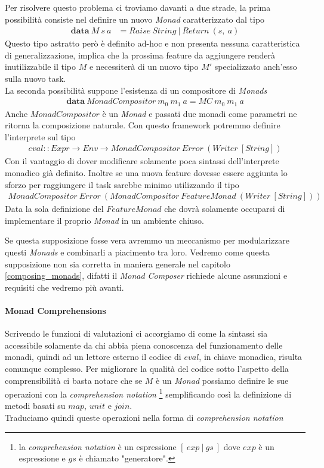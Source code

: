 Per risolvere questo problema ci troviamo davanti a due strade, la prima
possibilità consiste nel definire un nuovo \textit{Monad} caratterizzato dal
tipo
\begin{align*}
  \textbf{data}\ M\ s\ a &= Raise\ String\ |\ Return\ (s,\ a)
\end{align*}
Questo tipo astratto però è definito ad-hoc e non presenta nessuna
caratteristica di generalizzazione, implica che la prossima feature da
aggiungere renderà inutilizzabile il tipo $M$ e necessiterà di un nuovo tipo
$M'$ specializzato anch'esso sulla nuovo task.\\
La seconda possibilità suppone l'esistenza di un compositore di \textit{Monads}
\begin{align*}
  \textbf{data}\ MonadCompositor\ m_0\ m_1\ a = MC\ m_0\ m_1\ a
\end{align*}
Anche $MonadCompositor$ è un \textit{Monad} e passati due monadi come parametri
ne ritorna la composizione naturale.
Con questo framework potremmo definire l'interprete sul tipo
\begin{align*}
  eval :: Expr \to Env \to MonadCompositor\ Error\ (Writer\ [String])
\end{align*}
Con il vantaggio di dover modificare solamente poca sintassi dell'interprete
monadico già definito.
Inoltre se una nuova feature dovesse essere aggiunta lo sforzo per raggiungere
il task sarebbe minimo utilizzando il tipo
\begin{align*}
  MonadCompositor\ Error\ (MonadCompositor\ FeatureMonad\ (Writer\ [String]))
  \end{align*}
Data la sola definizione del $FeatureMonad$ che dovrà solamente occuparsi di
implementare il proprio \textit{Monad} in un ambiente chiuso.\newline

Se questa supposizione fosse vera avremmo un meccanismo per modularizzare
questi \textit{Monads} e combinarli a piacimento tra loro.
Vedremo come questa supposizione non sia corretta in maniera generale nel
capitolo \ref{composing_monads}, difatti il \textit{Monad Composer} richiede
alcune assunzioni e requisiti che vedremo più avanti.

\pagebreak
\paragraph*{Monad Comprehensions}
\label{monad_comprehensions}

Scrivendo le funzioni di valutazioni ci accorgiamo di come la sintassi sia
accessibile solamente da chi abbia piena conoscenza del funzionamento delle
monadi, quindi ad un lettore esterno il codice di $eval$, in chiave monadica,
risulta comunque complesso.
Per migliorare la qualità del codice sotto l'aspetto della comprensibilità ci
basta notare che se $M$ è un \textit{Monad} possiamo definire le sue operazioni
con la \textit{comprehension notation}
\footnote{la \textit{comprehension notation} è un espressione $[\ exp\ |\ gs\ ]$
dove $exp$ è un espressione e $gs$ è chiamato "generatore".}
semplificando così la definizione di metodi basati su $map$, $unit$ e $join$.\\
Traduciamo quindi queste operazioni nella forma di
\textit{comprehension notation}

